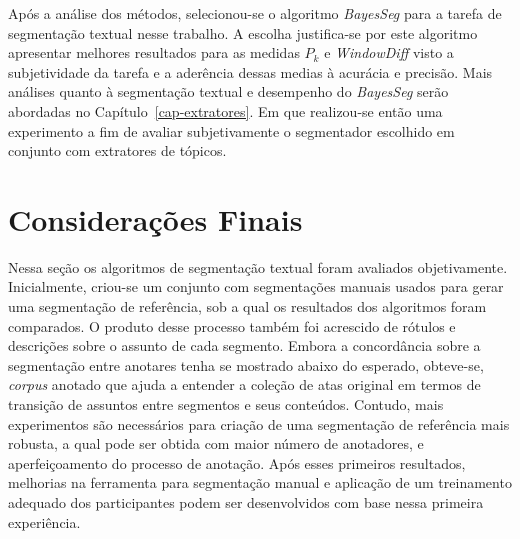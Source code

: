 


Após a análise dos métodos, selecionou-se o algoritmo \textit{BayesSeg} para a tarefa de segmentação textual nesse trabalho. 
A escolha justifica-se por este algoritmo apresentar melhores resultados para as medidas $P_k$ e \textit{WindowDiff} visto a subjetividade da tarefa e a aderência dessas medias à acurácia e precisão. Mais análises quanto à segmentação textual e desempenho do \textit{BayesSeg} serão abordadas no Capítulo~\ref{cap-extratores}. Em que realizou-se então uma experimento a fim de avaliar subjetivamente o segmentador escolhido em conjunto com extratores de tópicos.







\section{Considerações Finais}



Nessa seção os algoritmos de segmentação textual foram avaliados objetivamente. 
Inicialmente, criou-se um conjunto com segmentações manuais usados para gerar uma segmentação de referência, sob a qual os resultados dos algoritmos foram comparados. O produto  desse processo também foi acrescido de rótulos e descrições sobre o assunto de cada segmento.
Embora a concordância sobre a segmentação entre anotares tenha se mostrado abaixo do esperado, obteve-se, \textit{corpus} anotado que ajuda a entender a coleção de atas original em termos de transição de assuntos entre segmentos e seus conteúdos.
Contudo, mais experimentos são necessários para criação de uma segmentação de referência mais robusta, a qual pode ser obtida com maior número de anotadores, e aperfeiçoamento do processo de anotação. Após esses primeiros resultados, melhorias na ferramenta para segmentação manual e aplicação de um treinamento adequado dos participantes podem ser desenvolvidos com base nessa primeira experiência.

